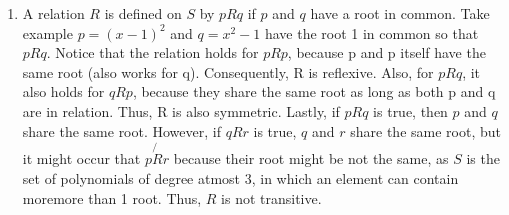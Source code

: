 \documentclass[12pt]{article}
\begin{document}
\begin{enumerate}
\begin{enumerate}
	\item
	A relation $R$ is defined on $S$ by $pRq$ if $p$ and $q$ have a root in common. Take example $p = (x - 1)^2$ and $q = x^2 - 1$ have the root 1 in common so that $pRq$. Notice that the relation holds for $pRp$, because p and p itself have the same root (also works for q). Consequently, R is reflexive. Also, for $pRq$, it also holds for $qRp$, because they share the same root as long as both p and q are in relation. Thus, R is also symmetric. Lastly, if $pRq$ is true, then $p$ and $q$ share the same root. However, if $qRr$ is true, $q$ and $r$ share the same root, but it might occur that $p\not{R}r$ because their root might be not the same, as $S$ is the set of polynomials of degree atmost 3, in which an element can contain moremore than 1 root. Thus, $R$ is not transitive.
\end{enumerate}


\end{enumerate}
\end{document}
